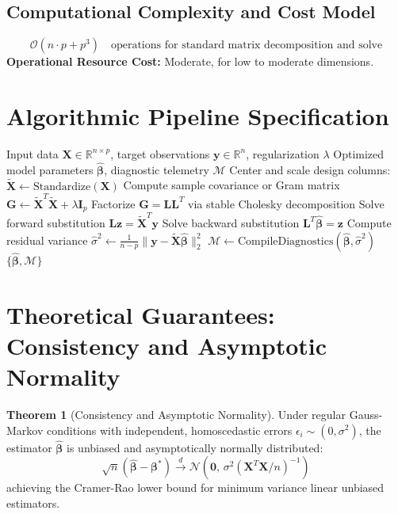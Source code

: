 \documentclass[11pt,a4paper]{article}
\theoremstyle{definition}
\newtheorem{theorem}{\textbf{Theorem}}[section]
\begin{document}
\subsection{Computational Complexity and Cost Model}
\begin{equation}
\mathcal{O}(n \cdot p + p^3) \quad \text{operations for standard matrix decomposition and solve}
\end{equation}
\textbf{Operational Resource Cost:} Moderate, for low to moderate dimensions.

\section{Algorithmic Pipeline Specification}

\begin{algorithm}[H]
\caption{Robust covariance Execution}
\begin{algorithmic}[1]
\Require Input data $\mathbf{X} \in \mathbb{R}^{n \times p}$, target observations $\mathbf{y} \in \mathbb{R}^n$, regularization $\lambda$
\Ensure Optimized model parameters $\hat{\boldsymbol{\beta}}$, diagnostic telemetry $\mathcal{M}$
\State Center and scale design columns: $\tilde{\mathbf{X}} \gets \text{Standardize}(\mathbf{X})$
\State Compute sample covariance or Gram matrix $\mathbf{G} \gets \tilde{\mathbf{X}}^T \tilde{\mathbf{X}} + \lambda \mathbf{I}_p$
\State Factorize $\mathbf{G} = \mathbf{L} \mathbf{L}^T$ via stable Cholesky decomposition
\State Solve forward substitution $\mathbf{L} \mathbf{z} = \tilde{\mathbf{X}}^T \mathbf{y}$
\State Solve backward substitution $\mathbf{L}^T \hat{\boldsymbol{\beta}} = \mathbf{z}$
\State Compute residual variance $\hat{\sigma}^2 \gets \frac{1}{n - p} \| \mathbf{y} - \tilde{\mathbf{X}} \hat{\boldsymbol{\beta}} \|_2^2$
\State $\mathcal{M} \gets \text{CompileDiagnostics}(\hat{\boldsymbol{\beta}}, \hat{\sigma}^2)$
\State \Return $\{\hat{\boldsymbol{\beta}}, \mathcal{M}\}$
\end{algorithmic}
\end{algorithm}

\section{Theoretical Guarantees: Consistency and Asymptotic Normality}

\begin{theorem}[Consistency and Asymptotic Normality]
Under regular Gauss-Markov conditions with independent, homoscedastic errors $\epsilon_i \sim (0, \sigma^2)$, the estimator $\hat{\boldsymbol{\beta}}$ is unbiased and asymptotically normally distributed:
\begin{equation}
\sqrt{n}(\hat{\boldsymbol{\beta}} - \boldsymbol{\beta}^*) \xrightarrow{d} \mathcal{N}\left(\mathbf{0}, \, \sigma^2 (\mathbf{X}^T \mathbf{X} / n)^{-1}\right)
\end{equation}
achieving the Cramer-Rao lower bound for minimum variance linear unbiased estimators.
\end{theorem}
\end{document}

